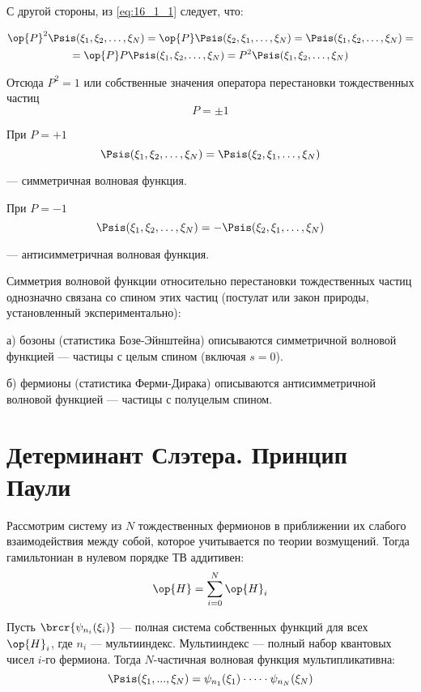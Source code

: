 С другой стороны, из \eqref{eq:16_1_1} следует, что:

\begin{gather*}
\op{P}^2 \Psis(\xi_1, \xi_2, \dots, \xi_N) = \op{P}\Psis(\xi_2, \xi_1, \dots, \xi_N) = \Psis(\xi_1, \xi_2, \dots, \xi_N) = \\= \op{P} P\Psis(\xi_1, \xi_2, \dots, \xi_N) = P^2 \Psis(\xi_1, \xi_2, \dots, \xi_N)
\end{gather*}

Отсюда $P^2 = 1$ или собственные значения оператора перестановки тождественных частиц 
$$\boxed{P = \pm 1}$$

При $P = +1$
$$
\Psis(\xi_1, \xi_2, \dots, \xi_N) = \Psis(\xi_2, \xi_1, \dots, \xi_N)
$$

--- симметричная волновая функция.

При $P = -1$
$$
\Psis(\xi_1, \xi_2, \dots, \xi_N) = -\Psis(\xi_2, \xi_1, \dots, \xi_N)
$$ 

--- антисимметричная волновая функция.

Симметрия волновой функции относительно перестановки тождественных частиц однозначно связана со спином этих частиц (постулат или закон природы, установленный экспериментально):

а) бозоны (статистика Бозе-Эйнштейна) описываются симметричной волновой функцией --- частицы с целым спином (включая $s = 0$).

б) фермионы (статистика Ферми-Дирака) описываются антисимметричной волновой функцией --- частицы с полуцелым спином.

\section{Детерминант Слэтера. Принцип Паули}

Рассмотрим систему из $N$ тождественных фермионов в приближении их слабого взаимодействия между собой, которое учитывается по теории возмущений. Тогда гамильтониан в нулевом порядке ТВ аддитивен:
$$
\op{H} = \sum_{i=0}^N\op{H}_i
$$

Пусть $\brcr{\psi_{n_i}(\xi_i)}$ --- полная система собственных функций для всех $\op{H}_i$, где $n_i$ --- мультииндекс. Мультииндекс --- полный набор квантовых чисел $i$-го фермиона. Тогда $N$-частичная волновая функция мультипликативна:
\begin{equation}
\label{eq:16_2_1}
\Psis(\xi_1, ..., \xi_N) = \psi_{n_1}(\xi_1) \cdot \dots \cdot \psi_{n_N}(\xi_N)
\end{equation}

